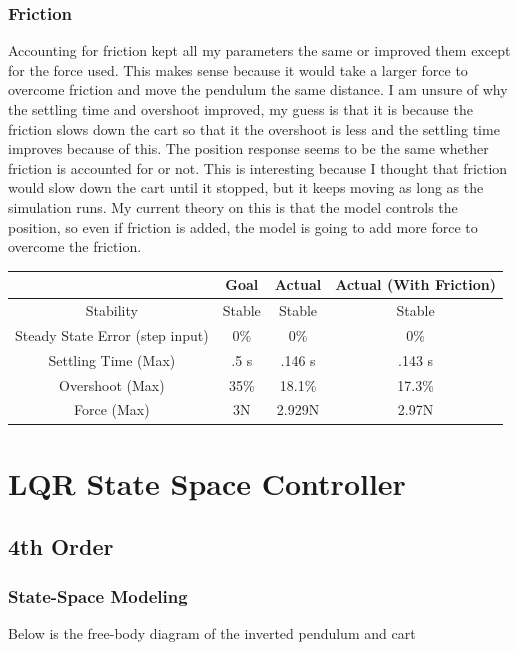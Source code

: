 \documentclass{article}
\begin{document}
\subsubsection{Friction}

Accounting for friction kept all my parameters the same or improved them except for the force used. This makes sense because it would take a larger force to overcome friction and move the pendulum the same distance. I am unsure of why the settling time and overshoot improved, my guess is that it is because the friction slows down the cart so that it the overshoot is less and the settling time improves because of this. The position response seems to be the same whether friction is accounted for or not. This is interesting because I thought that friction would slow down the cart until it stopped, but it keeps moving as long as the simulation runs. My current theory on this is that the model controls the position, so even if friction is added, the model is going to add more force to overcome the friction.

\begin{center}
\begin{tabular}{|c | c | c | c|} 
\hline
 & Goal & Actual & Actual (With Friction)\\ 
\hline
Stability &  Stable & Stable & Stable\\ 
\hline
Steady State Error (step input)  & 0\% & 0\% & 0\%\\ 
\hline
Settling Time (Max) & .5 s & .146 s & .143 s \\
\hline
Overshoot (Max)& 35\% & 18.1\% & 17.3\% \\
\hline
Force (Max) & 3N & 2.929N & 2.97N\\
\hline
\end{tabular}
\end{center}

\section{LQR State Space Controller}
\subsection{4th Order}
\subsubsection{State-Space Modeling}
Below is the free-body diagram of the inverted pendulum and cart
\end{document}

